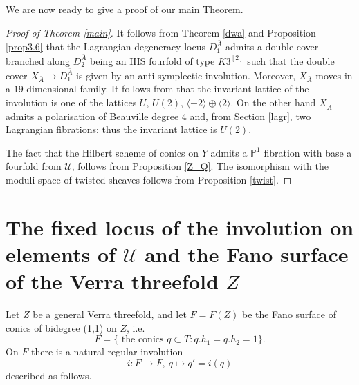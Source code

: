 \documentclass[a4paper,11pt]{amsart}
\theoremstyle{definition}
\numberwithin{equation}{section}
\numberwithin{equation}{section} \theoremstyle{definition}
\begin{document}
We are now ready to give a proof of our main Theorem.
\begin{proof}[Proof of Theorem \ref{main}]
It follows from Theorem \ref{dwa} and Proposition \ref{prop3.6} that the Lagrangian degeneracy locus $D_1^{\bar{A}}$ admits
a double cover branched along $D_2^{\bar{A}}$ being an IHS fourfold of type $K3^{[2]}$ such
that the double cover $X_{\bar{A}}\to D_1^{\bar{A}}$ is given by an anti-symplectic involution. Moreover, $X_{\bar{A}}$ 
moves in a $19$-dimensional family. It follows from \cite{OW} that the invariant lattice of the involution is one of the lattices $U$, $U(2)$, $\langle-2\rangle \oplus \langle 2\rangle$.
On the other hand $X_{\bar{A}}$ admits a polarisation of Beauville degree $4$ and, from Section \ref{lagr}, two Lagrangian fibrations: thus the invariant lattice is $U(2)$.

The fact that the Hilbert scheme of conics on $Y$ admits a ${{\mathbb{P}}}^1$ fibration with base a fourfold from $\mathcal{U}$, follows from  Proposition \ref{Z_Q}.
The isomorphism with the moduli space of twisted sheaves follows from Proposition \ref{twist}.
\end{proof}

\section{ The fixed locus of the involution on elements of $\mathcal{U}$ and the Fano surface of the Verra threefold $Z$} \label{Verra-Involutions}

Let $Z$ be a general Verra threefold, and let $F = F(Z)$ be the Fano surface 
of conics of bidegree (1,1) on $Z$, 
i.e. 
$$
F = \{ \mbox{ the conics } q \subset T: q.h_1 = q.h_2 = 1 \}.
$$
On $F$ there is a natural regular involution 
$$
i:F \rightarrow F, \ q \mapsto q' = i(q)
$$ 
described as follows. 
\end{document}

